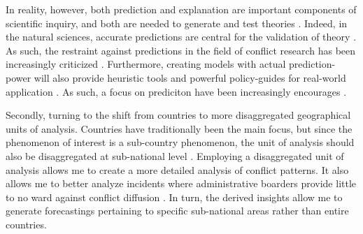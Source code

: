 \documentclass[a4paper]{article}
\begin{document}
In reality, however, both prediction and explanation are important components of scientific inquiry, and both are needed to generate and test theories \citep{Schrodt_2014, chadefaux2017conflict}. Indeed, in the natural sciences, accurate predictions are central for the validation of theory \citep[289]{Schrodt_2014}. As such, the restraint against predictions in the field of conflict research has been increasingly criticized \citep{King_Zeng_2001, Ward_Greenhill_Bakke_2010, Goldstone_2010, Schrodt_2014, chadefaux2017conflict}. Furthermore, creating models with actual prediction-power will also provide heuristic tools and powerful policy-guides for real-world application \citep[372]{Ward_Greenhill_Bakke_2010}. As such, a focus on prediciton have been increasingly encourages \citep{Ward_Greenhill_Bakke_2010, Schrodt_2014}.\par


Secondly, turning to the shift from countries to more disaggregated geographical units of analysis. Countries have traditionally been the main focus, but since the phenomenon of interest is a sub-country phenomenon, the unit of analysis should also be disaggregated at sub-national level \citep[490]{Cederman_Gleditsch_2009}. Employing a disaggregated unit of analysis allows me to create a more detailed analysis of conflict patterns. It also allows me to better analyze incidents where administrative boarders provide little to no ward against conflict diffusion \citep[445-446]{ol2010afghanistan}. In turn, the derived insights allow me to generate forecastings pertaining to specific sub-national areas rather than entire countries.\par

\end{document}
